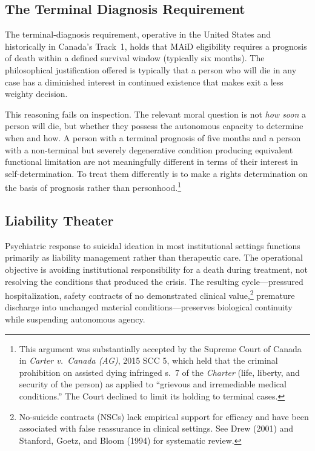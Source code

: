 \documentclass[11pt, letterpaper]{article}
\begin{document}
\subsection{The Terminal Diagnosis Requirement}

The terminal-diagnosis requirement, operative in the United States and historically
in Canada's Track~1, holds that MAiD eligibility requires a prognosis of death within
a defined survival window (typically six months). The philosophical justification
offered is typically that a person who will die in any case has a diminished interest
in continued existence that makes exit a less weighty decision.

This reasoning fails on inspection. The relevant moral question is not \textit{how soon}
a person will die, but whether they possess the autonomous capacity to determine when
and how. A person with a terminal prognosis of five months and a person with a
non-terminal but severely degenerative condition producing equivalent functional
limitation are not meaningfully different in terms of their interest in self-determination.
To treat them differently is to make a rights determination on the basis of prognosis
rather than personhood.\footnote{%
  This argument was substantially accepted by the Supreme Court of Canada in
  \textit{Carter v.\ Canada (AG)}, 2015 SCC 5, which held that the criminal prohibition
  on assisted dying infringed s.\ 7 of the \textit{Charter} (life, liberty, and
  security of the person) as applied to ``grievous and irremediable medical conditions.''
  The Court declined to limit its holding to terminal cases.}

\subsection{Liability Theater}

Psychiatric response to suicidal ideation in most institutional settings functions
primarily as liability management rather than therapeutic care. The operational
objective is avoiding institutional responsibility for a death during treatment, not
resolving the conditions that produced the crisis. The resulting cycle---pressured
hospitalization, safety contracts of no demonstrated clinical value,\footnote{%
  No-suicide contracts (NSCs) lack empirical support for efficacy and have been
  associated with false reassurance in clinical settings. See Drew (2001) and
  Stanford, Goetz, and Bloom (1994) for systematic review.}
premature discharge into unchanged material conditions---preserves biological
continuity while suspending autonomous agency.
\end{document}
